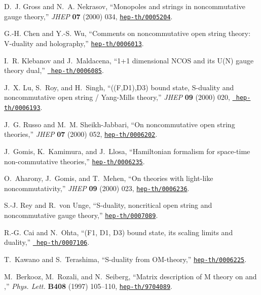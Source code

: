 \documentclass[a4paper,twoside,titlepage,12pt]{article}
\begin{document}
\begin{thebibliography}{10}
D.~J. Gross and N.~A. Nekrasov, ``Monopoles and strings in noncommutative gauge
  theory,'' {\em JHEP} {\bf 07} (2000) 034,
  \href{http://xxx.lanl.gov/abs/hep-th/0005204}{{\tt hep-th/0005204}}.

G.-H. Chen and Y.-S. Wu, ``Comments on noncommutative open string theory:
  {V-duality} and holography,''
  \href{http://xxx.lanl.gov/abs/hep-th/0006013}{{\tt hep-th/0006013}}.

I.~R. Klebanov and J.~Maldacena, ``1+1 dimensional {NCOS} and its {U(N)} gauge
  theory dual,'' \href{http://xxx.lanl.gov/abs/hep-th/0006085}{{\tt
  hep-th/0006085}}.

J.~X. Lu, S.~Roy, and H.~Singh, ``{((F,D1),D3)} bound state, {S-duality} and
  noncommutative open string / {Yang-Mills} theory,'' {\em JHEP} {\bf 09}
  (2000) 020, \href{http://xxx.lanl.gov/abs/hep-th/0006193}{{\tt
  hep-th/0006193}}.

J.~G. Russo and M.~M. Sheikh-Jabbari, ``On noncommutative open string
  theories,'' {\em JHEP} {\bf 07} (2000) 052,
  \href{http://xxx.lanl.gov/abs/hep-th/0006202}{{\tt hep-th/0006202}}.

J.~Gomis, K.~Kamimura, and J.~Llosa, ``Hamiltonian formalism for space-time
  non-commutative theories,''
  \href{http://xxx.lanl.gov/abs/hep-th/0006235}{{\tt hep-th/0006235}}.

O.~Aharony, J.~Gomis, and T.~Mehen, ``On theories with light-like
  noncommutativity,'' {\em JHEP} {\bf 09} (2000) 023,
  \href{http://xxx.lanl.gov/abs/hep-th/0006236}{{\tt hep-th/0006236}}.

S.-J. Rey and R.~von Unge, ``{S-duality}, noncritical open string and
  noncommutative gauge theory,''
  \href{http://xxx.lanl.gov/abs/hep-th/0007089}{{\tt hep-th/0007089}}.

R.-G. Cai and N.~Ohta, ``{(F1, D1, D3)} bound state, its scaling limits and
  {\coordHE{}} duality,'' \href{http://xxx.lanl.gov/abs/hep-th/0007106}{{\tt
  hep-th/0007106}}.

T.~Kawano and S.~Terashima, ``{S}-duality from {OM}-theory,''
  \href{http://xxx.lanl.gov/abs/hep-th/0006225}{{\tt hep-th/0006225}}.

M.~Berkooz, M.~Rozali, and N.~Seiberg, ``Matrix description of {M} theory on
  {\coordHE{}} and {\coordHE{}},'' {\em Phys. Lett.} {\bf B408} (1997) 105--110,
  \href{http://xxx.lanl.gov/abs/hep-th/9704089}{{\tt hep-th/9704089}}.


\end{thebibliography}
\end{document}
